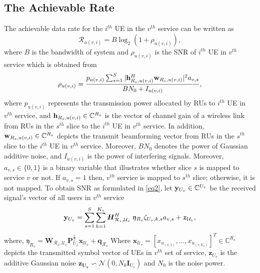 \documentclass[conference]{IEEEtran}
\begin{document}
\subsection{The Achievable Rate}
The achievable data rate for the $i^{th}$ UE in the $v^{th}$ service can be written as
\begin{equation}\label{eq1}
\mathcal{R}_{u(v,i)} = B \log_2({1+ \rho_{u(v,i)}}),
\end{equation}
where $B$ is the bandwidth of system and $\rho_{u(v,i)}$ is the SNR of $i^{th}$ UE in $v^{th}$ service which is obtained from
\begin{equation}\label{eq2}
\rho_{u(v,i)} =  \frac{p_{u(v,i)}\sum_{s=1}^{S}|\bold{h}_{R_s,u(v,i)}^H \bold{w}_{R_s,u(v,i)}|^2 a_{v,s}}{BN_0 + I_{u(v,i)}},
\end{equation}
where $p_{u(v,i)}$ represents the transmission power allocated by RUs to $i^{th}$ UE in $v^{th}$ service, and
$\bold{h}_{R_s,u(v,i)} \in \mathbb{C}^{{R}_s}$ is the vector of channel gain of a wireless link from RUs in the $s^{th}$ slice to the $i^{th}$ UE in $v^{th}$ service. In addition, $\bold{w}_{R_s,u(v,i)} \in \mathbb{C}^{{R}_s}$ depicts the  transmit beamforming vector from RUs in the $s^{th}$ slice to the $i^{th}$ UE in $v^{th}$ service. Moreover, $BN_0$ denotes the power of Gaussian additive noise, and $I_{u(v,i)}$ is the power of interfering signals. Moreover, $a_{v,s} \in \{0,1\}$ is a binary variable that illustrates whether slice $s$ is mapped to service $v$ or not. If $a_{v,s} =1$ then, $v^{th}$ service is mapped to $s^{th}$ slice; otherwise, it is not mapped.
\newline
To obtain SNR as formulated in \eqref{eq2}, let $\bold{y}_{U_v}\in \mathbb{C}^{U_v} $ be the received signal's vector of all users in $v^{th}$ service
\begin{equation}\label{eq3}
\bold{y}_{U_v} = \sum_{s = 1}^{S}\sum_{k=1}^{K_s} \boldsymbol{H}^H_{\mathcal{R}_s,\mathcal{U}_v} \
\mathfrak{y}_{R_s}\zeta_{U_v,k,s} a_{v,s}+ \boldsymbol{z}_{\mathcal{U}_v},
\end{equation}
where, $\mathfrak{y}_{R_s} = \boldsymbol{W}_{\mathcal{R}_s,\mathcal{U}_v}\boldsymbol{P}_{U_v}^{\frac{1}{2}}\boldsymbol{x}_{\mathcal{U}_v}+ \boldsymbol{q}_{\mathcal{R}_s}$
Where $\boldsymbol{x}_{ \mathcal{U}_v} = [x_{ u_{(v,1)}},...,x_{ u_{(v,\mathcal{U}_v)}}]^T \in \mathbb{C}^{{R}_s } $ depicts the transmitted symbol vector of UEs in $v^{th}$ set of service,  $\boldsymbol{z}_{U_v}$ is the additive Gaussian noise $\boldsymbol{z_{U_v}} \backsim \mathcal{N}(0,N_0\boldsymbol{I}_{{U}_v})$ and $N_0$ is the noise power.
\end{document}
